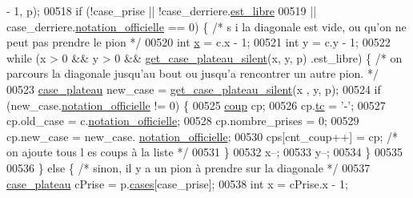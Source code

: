 \begin{DoxyCode}
      - 1, p);
00518                 \textcolor{keywordflow}{if} (!case\_prise || !case\_derriere.\hyperlink{structcase__plateau_a173f25d2fd7c653d77ca8174ba4f636d}{est_libre}
00519                                 || case\_derriere.\hyperlink{structcase__plateau_ad510581b324604a9cf685cbb769a421a}{notation_officielle} == 0) \{ \textcolor{comment}{/* s
      i la diagonale est vide, ou qu'on ne peut pas prendre le pion */}
00520                         \textcolor{keywordtype}{int} \hyperlink{plateau_8h_a9e00f85b4b6ec2d8bdfbe94ff40f0eeeacab1e15e82c5976bfb476ddfe145263c}{x} = c.x - 1;
00521                         \textcolor{keywordtype}{int} y = c.y - 1;
00522                         \textcolor{keywordflow}{while} (x > 0 && y > 0 && \hyperlink{plateau_8h_a60a8f706865d0ae9087f8d65d4667655}{get_case_plateau_silent}(x, y, p)
      .est\_libre) \{ \textcolor{comment}{/* on parcours la diagonale jusqu'au bout ou jusqu'a rencontrer un 
      autre pion. */}
00523                                 \hyperlink{structcase__plateau}{case_plateau} new\_case = \hyperlink{plateau_8h_a60a8f706865d0ae9087f8d65d4667655}{get_case_plateau_silent}(x
      , y, p);
00524                                 \textcolor{keywordflow}{if} (new\_case.\hyperlink{structcase__plateau_ad510581b324604a9cf685cbb769a421a}{notation_officielle} != 0) \{
00525                                         \hyperlink{structcoup}{coup} cp;
00526                                         cp.\hyperlink{structcoup_aa33da004dccb192cb33bc00c26c6e859}{tc} = \textcolor{charliteral}{'-'};
00527                                         cp.old\_case = c.\hyperlink{structcase__plateau_ad510581b324604a9cf685cbb769a421a}{notation_officielle};
00528                                         cp.nombre\_prises = 0;
00529                                         cp.new\_case = new\_case.
      \hyperlink{structcase__plateau_ad510581b324604a9cf685cbb769a421a}{notation_officielle};
00530                                         cps[cnt\_coup++] = cp; \textcolor{comment}{/* on ajoute tous l
      es coups à la liste */}
00531                                 \}
00532                                 x--;
00533                                 y--;
00534                         \}
00535 
00536                 \} \textcolor{keywordflow}{else} \{ \textcolor{comment}{/* sinon, il y a un pion à prendre sur la diagonale */}
00537                         \hyperlink{structcase__plateau}{case_plateau} cPrise = p.\hyperlink{structplateau_a6afaa60f594542e0d742b0c6d3223392}{cases}[case\_prise];
00538                         \textcolor{keywordtype}{int} x = cPrise.x - 1;

\end{DoxyCode}
